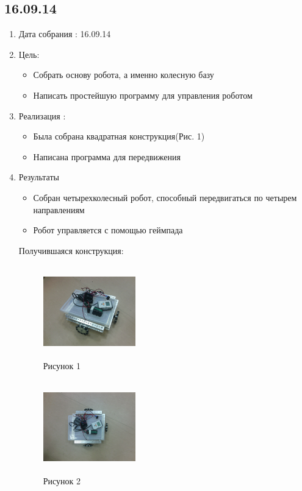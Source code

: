 \documentclass[12pt]{article}
\begin{document}
	\subsection{16.09.14}
		\begin{enumerate}
			\item Дата собрания : 16.09.14
			\item Цель:
				\begin{itemize}
					  \item Собрать основу робота, а именно колесную базу
					  \item Написать простейшую программу для управления роботом
				\end{itemize}			
			\item Реализация :
				\begin{itemize}
					\item Была собрана квадратная конструкция(Рис. 1)
					\item Написана программа для передвижения
				\end{itemize}
			\item Результаты
				\begin{itemize}
					\item Собран четырехколесный робот, способный передвигаться по четырем направлениям
					\item Робот управляется с помощью геймпада
				\end{itemize}
				Получившаяся конструкция:
				\begin{figure} [h]
					\centering
					\begin{minipage}{0.3\linewidth}
						\includegraphics[width=40mm,height=40mm]{1_1_robot}\\ Рисунок 1
					\end{minipage}
					\begin{minipage}{0.3\linewidth}
						\includegraphics[width=40mm,height=40mm]{1_2_robot}\\ Рисунок 2
					\end{minipage}
				\end{figure}
		\end{enumerate}
	\newpage
	
\end{document}
